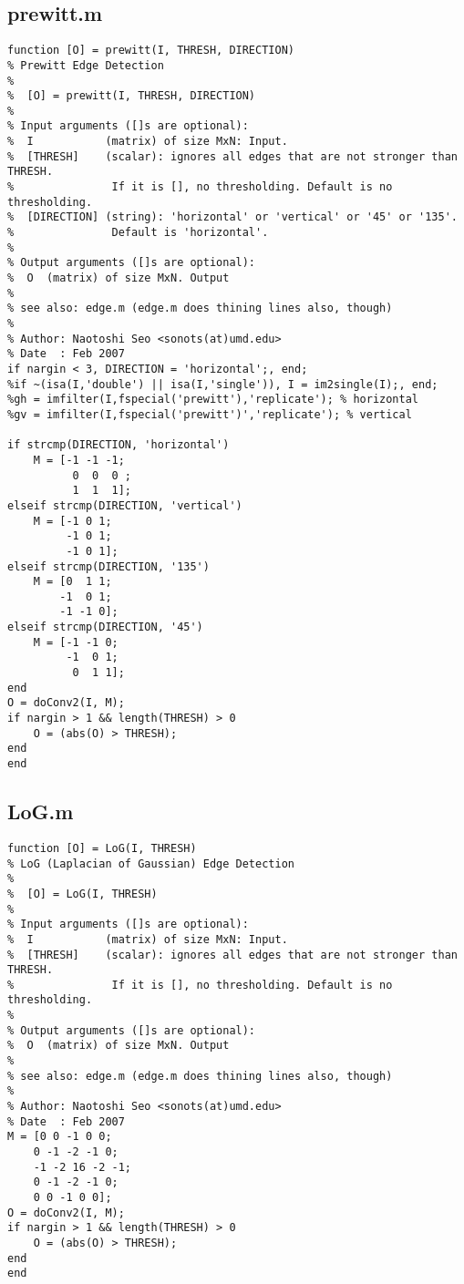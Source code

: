 \documentclass[article,oneside]{memoir}
\begin{document}
\begin{highboostfilter2.m}
\subsection{prewitt.m}

\begin{verbatim}
function [O] = prewitt(I, THRESH, DIRECTION)
% Prewitt Edge Detection
%
%  [O] = prewitt(I, THRESH, DIRECTION)
%
% Input arguments ([]s are optional):
%  I           (matrix) of size MxN: Input.
%  [THRESH]    (scalar): ignores all edges that are not stronger than THRESH.
%               If it is [], no thresholding. Default is no thresholding.
%  [DIRECTION] (string): 'horizontal' or 'vertical' or '45' or '135'. 
%               Default is 'horizontal'.
%
% Output arguments ([]s are optional):
%  O  (matrix) of size MxN. Output
%
% see also: edge.m (edge.m does thining lines also, though)
%
% Author: Naotoshi Seo <sonots(at)umd.edu>
% Date  : Feb 2007
if nargin < 3, DIRECTION = 'horizontal';, end;
%if ~(isa(I,'double') || isa(I,'single')), I = im2single(I);, end;
%gh = imfilter(I,fspecial('prewitt'),'replicate'); % horizontal
%gv = imfilter(I,fspecial('prewitt')','replicate'); % vertical

if strcmp(DIRECTION, 'horizontal')
    M = [-1 -1 -1;
          0  0  0 ;
          1  1  1];
elseif strcmp(DIRECTION, 'vertical')
    M = [-1 0 1;
         -1 0 1;
         -1 0 1];
elseif strcmp(DIRECTION, '135')
    M = [0  1 1;
        -1  0 1;
        -1 -1 0];
elseif strcmp(DIRECTION, '45')
    M = [-1 -1 0;
         -1  0 1;
          0  1 1];
end
O = doConv2(I, M);
if nargin > 1 && length(THRESH) > 0
    O = (abs(O) > THRESH);
end
end

\end{verbatim}

\subsection{LoG.m}

\begin{verbatim}
function [O] = LoG(I, THRESH)
% LoG (Laplacian of Gaussian) Edge Detection
%
%  [O] = LoG(I, THRESH)
%
% Input arguments ([]s are optional):
%  I           (matrix) of size MxN: Input.
%  [THRESH]    (scalar): ignores all edges that are not stronger than THRESH.
%               If it is [], no thresholding. Default is no thresholding.
%
% Output arguments ([]s are optional):
%  O  (matrix) of size MxN. Output
%
% see also: edge.m (edge.m does thining lines also, though)
%
% Author: Naotoshi Seo <sonots(at)umd.edu>
% Date  : Feb 2007
M = [0 0 -1 0 0;
    0 -1 -2 -1 0;
    -1 -2 16 -2 -1;
    0 -1 -2 -1 0;
    0 0 -1 0 0];
O = doConv2(I, M);
if nargin > 1 && length(THRESH) > 0
    O = (abs(O) > THRESH);
end
end
\end{verbatim}


\end{highboostfilter2.m}
\end{document}
